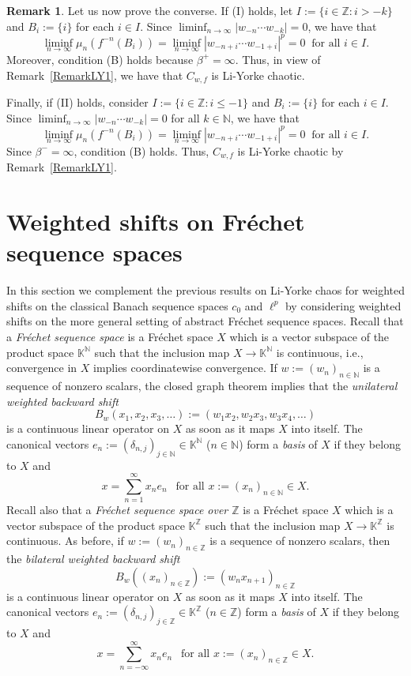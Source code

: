 \documentclass[12pt]{amsart}
\theoremstyle{theorem}
\theoremstyle{definition}
\newtheorem{remark}[theorem]{Remark}
\theoremstyle{remark} \theoremstyle{question} \theoremstyle{example}
\newcommand{\N}{\mathbb{N}}
\newcommand{\Z}{\mathbb{Z}}
\newcommand{\K}{\mathbb{K}}
\begin{document}
\begin{remark}
\smallskip
Let us now prove the converse. If (I) holds, let $I\!:= \{i \in \Z : i > -k\}$ and $B_i\!:= \{i\}$ for each $i \in I$.
Since $\liminf_{n \to \infty} |w_{-n} \cdots w_{-k}| = 0$, we have that
\[
\liminf_{n \to \infty} \mu_n(f^{-n}(B_i)) = \liminf_{n \to \infty} |w_{-n+i} \cdots w_{-1+i}|^p = 0 \ \text{ for all } i \in I.
\]
Moreover, condition (B) holds because $\beta^+ = \infty$. 
Thus, in view of Remark~\ref{RemarkLY1}, we have that $C_{w,f}$ is Li-Yorke chaotic. 

Finally, if (II) holds, consider $I\!:= \{i \in \Z : i \leq -1\}$ and $B_i\!:= \{i\}$ for each $i \in I$. 
Since $\liminf_{n \to \infty} |w_{-n} \cdots w_{-k}| = 0$ for all $k \in \N$, we have that
\[
\liminf_{n \to \infty} \mu_n(f^{-n}(B_i)) = \liminf_{n \to \infty} |w_{-n+i} \cdots w_{-1+i}|^p = 0 \ \text{ for all } i \in I.
\]
Since $\beta^- = \infty$, condition (B) holds. Thus, $C_{w,f}$ is Li-Yorke chaotic by Remark~\ref{RemarkLY1}. 
\end{remark}


\section{Weighted shifts on Fr\'echet sequence spaces}\label{Section4}

In this section we complement the previous results on Li-Yorke chaos for weighted shifts on the classical Banach sequence spaces 
$c_0$ and $\ell^p$ by considering weighted shifts on the more general setting of abstract Fr\'echet sequence spaces.
Recall that a {\em Fr\'echet sequence space} is a Fr\'echet space $X$ which is a vector subspace of the product space $\K^\N$
such that the inclusion map $X \to \K^\N$ is continuous, i.e., convergence in $X$ implies coordinatewise convergence.
If $w\!:= (w_n)_{n \in \N}$ is a sequence of nonzero scalars, the closed graph theorem implies that the 
{\em unilateral weighted backward shift}
\[
B_w(x_1,x_2,x_3,\ldots)\!:= (w_1x_2,w_2x_3,w_3x_4,\ldots)
\]
is a continuous linear operator on $X$ as soon as it maps $X$ into itself.
The canonical vectors $e_n\!:= (\delta_{n,j})_{j \in \N} \in \K^\N$ ($n \in \N$) form a {\em basis} of $X$ if they belong to $X$ and
\[
x = \sum_{n=1}^\infty x_n e_n \ \ \text{ for all } x\!:= (x_n)_{n \in \N} \in X.
\]
Recall also that a {\em Fr\'echet sequence space over $\Z$} is a Fr\'echet space $X$ which is a vector subspace of the product space 
$\K^\Z$ such that the inclusion map $X \to \K^\Z$ is continuous. As before, if $w\!:= (w_n)_{n \in \Z}$ is a sequence of nonzero scalars,
then the {\em bilateral weighted backward shift}
\[
B_w((x_n)_{n \in \Z})\!:= (w_n x_{n+1})_{n \in \Z}
\]
is a continuous linear operator on $X$ as soon as it maps $X$ into itself.
The canonical vectors $e_n\!:= (\delta_{n,j})_{j \in \Z} \in \K^\Z$ ($n \in \Z$) form a {\em basis} of $X$ if they belong to $X$ and
\[
x = \sum_{n=-\infty}^\infty x_n e_n \ \ \text{ for all } x\!:= (x_n)_{n \in \Z} \in X.
\]
\end{document}

